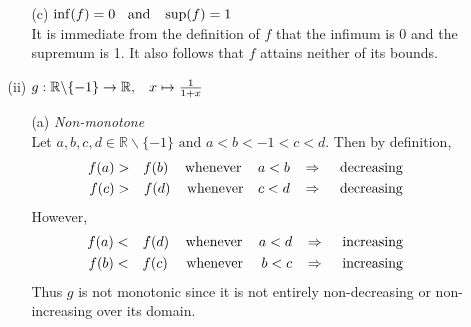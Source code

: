 \documentclass[12pt]{amsart}
\begin{document}
\begin{enumerate}
\begin{enumerate}
\begin{enumerate}
					\item[(c)] $\inf(f) = 0 \hspace{0.2cm} \text{ and }  \hspace{0.2cm} \sup(f) = 1$ \\
					It is immediate from the definition of $f$ that the infimum is 0 and the supremum is 1.  
					It also follows that $f$ attains neither of its bounds.\\
					
				\end{enumerate}
			
			\item[(ii)] $g: \mathbb{R} \backslash \{-1\} \rightarrow \mathbb{R}, \hspace{0.3cm} x \mapsto 
					\frac{1}{1+x}$\\
			
				\begin{enumerate}
				
					\item[(a)]  \emph{Non-monotone}\\
					Let $a,b,c,d \in \mathbb{R} \backslash \{-1\} \text{ and } a<b<-1<c<d$. Then by 						definition,
					\begin{eqnarray}
						f(a)&>& f(b) \hspace{0.3cm} \text{ whenever } \hspace{0.3cm} a<b 
						\hspace{0.3cm} \Rightarrow \hspace{0.3cm} \text { decreasing }\nonumber \\
						f(c)&>& f(d) \hspace{0.3cm} \text{ whenever } \hspace{0.25cm} c<d 
						\hspace{0.3cm} \Rightarrow \hspace{0.3cm} \text { decreasing }\nonumber 
					\end{eqnarray}
					However,
					\begin{eqnarray}
						f(a)&<&f(d) \hspace{0.3cm} \text{ whenever } \hspace{0.3cm} a<d 
						\hspace{0.3cm} \Rightarrow \hspace{0.3cm} \text { increasing }\nonumber \\
						f(b)&<&f(c) \hspace{0.35cm} \text{ whenever } \hspace{0.35cm} b<c 
						\hspace{0.3cm} \Rightarrow \hspace{0.3cm} \text { increasing }\nonumber 
					\end{eqnarray}
					Thus $g$ is not monotonic since it is not entirely non-decreasing or non-increasing
					over its domain.\\
					

\end{enumerate}
\end{enumerate}
\end{enumerate}
\end{document}
